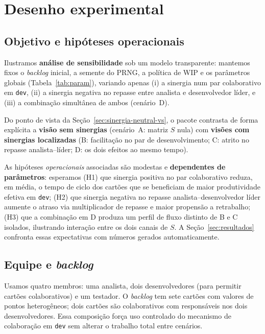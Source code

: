 \section{Desenho experimental}
\label{sec:experimentos}

\subsection{Objetivo e hipóteses operacionais}
Ilustramos \textbf{análise de sensibilidade} sob um modelo transparente: mantemos fixos o \emph{backlog} inicial, a semente do PRNG, a política de WIP e os parâmetros globais (Tabela~\ref{tab:param}), variando apenas (i) a sinergia num par colaborativo em \texttt{dev}, (ii) a sinergia negativa no repasse entre analista e desenvolvedor líder, e (iii) a combinação simultânea de ambos (cenário~D).

Do ponto de vista da Seção~\ref{sec:sinergia-neutral-vs}, o pacote contrasta de forma explícita a \textbf{visão sem sinergias} (cenário~A: matriz $S$ nula) com \textbf{visões com sinergias localizadas} (B: facilitação no par de desenvolvimento; C: atrito no repasse analista--líder; D: os dois efeitos ao mesmo tempo).

As hipóteses \emph{operacionais} associadas são modestas e \textbf{dependentes de parâmetros}: esperamos (H1) que sinergia positiva no par colaborativo reduza, em média, o tempo de ciclo dos cartões que se beneficiam de maior produtividade efetiva em \texttt{dev}; (H2) que sinergia negativa no repasse analista--desenvolvedor líder aumente o atraso via multiplicador de repasse e maior propensão a retrabalho; (H3) que a combinação em D produza um perfil de fluxo distinto de B e C isolados, ilustrando interação entre os dois canais de $S$. A Seção~\ref{sec:resultados} confronta essas expectativas com números gerados automaticamente.

\subsection{Equipe e \emph{backlog}}
Usamos quatro membros: uma analista, dois desenvolvedores (para permitir cartões colaborativos) e um testador. O \emph{backlog} tem sete cartões com valores de pontos heterogêneos; dois cartões são colaborativos com responsáveis nos dois desenvolvedores. Essa composição força uso controlado do mecanismo de colaboração em \texttt{dev} sem alterar o trabalho total entre cenários.

